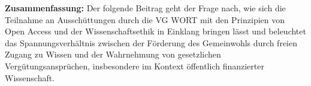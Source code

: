 \textbf{Zusammenfassung:} Der folgende Beitrag geht der Frage nach, wie
sich die Teilnahme an Ausschüttungen durch die VG WORT mit den
Prinzipien von Open Access und der Wissenschaftsethik in Einklang
bringen lässt und beleuchtet das Spannungsverhältnis zwischen der
Förderung des Gemeinwohls durch freien Zugang zu Wissen und der
Wahrnehmung von gesetzlichen Vergütungsansprüchen, insbesondere im
Kontext öffentlich finanzierter Wissenschaft.
